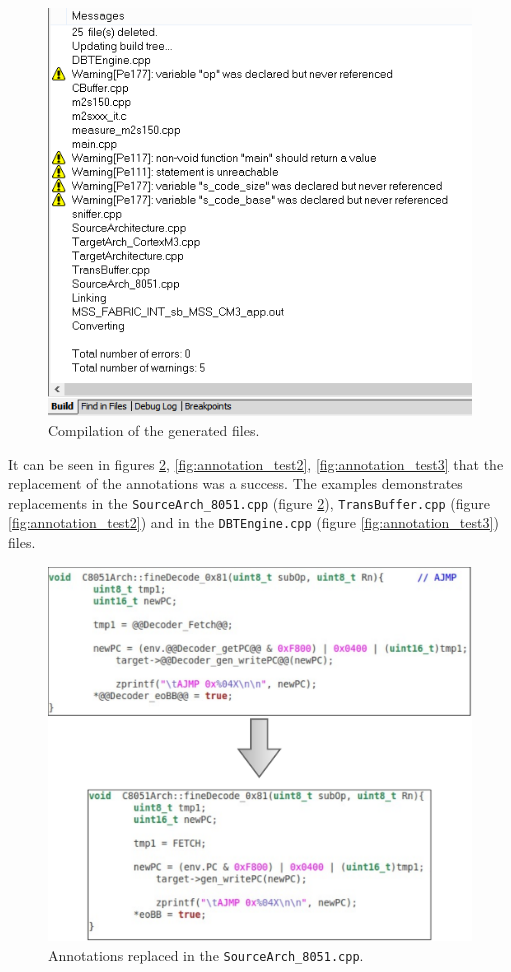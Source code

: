 \begin{figure}[H]
\centerline{
\includegraphics[scale=0.5]{images/compilar}
}
\caption{Compilation of the generated files.}
\label{fig:final_files2}
\end{figure}

It can be seen in figures \ref{fig:annotation_test1}, \ref{fig:annotation_test2}, \ref{fig:annotation_test3} that the replacement of the annotations was  a success. The examples demonstrates replacements in the \texttt{SourceArch\_8051.cpp} (figure \ref{fig:annotation_test1}), \texttt{TransBuffer.cpp} (figure \ref{fig:annotation_test2}) and in the \texttt{DBTEngine.cpp} (figure \ref{fig:annotation_test3}) files.

\begin{figure}[H]
\centerline{
\includegraphics[scale=0.4]{images/annotation_test1}
}
\caption{Annotations replaced in the \texttt{SourceArch\_8051.cpp}.}
\label{fig:annotation_test1}
\end{figure}

